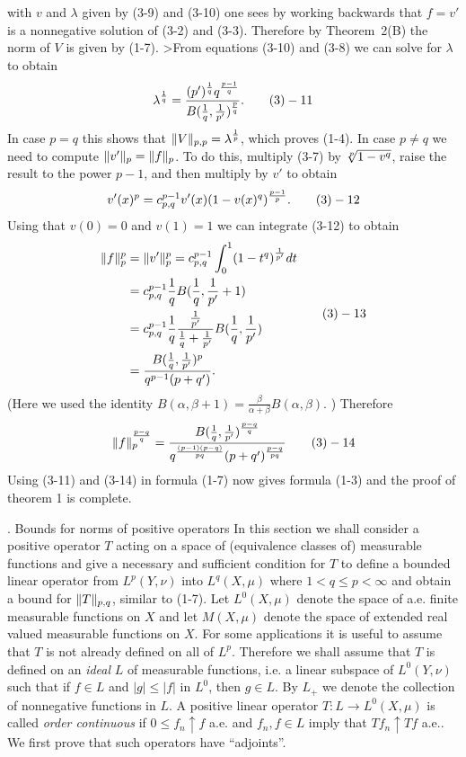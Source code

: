 with $v$ and $\lambda$ given by (3-9) and (3-10) one sees by working backwards
that $f=v'$ is a nonnegative solution of (3-2) and (3-3). Therefore by Theorem\
2(B) the norm of $V$ is given by (1-7). 
>From equations (3-10) and (3-8) we can solve for $\lambda$ to
obtain $$\lambda^{\frac 1q} =\frac {(p')^{\frac 1q}q^{\frac {p-1}q}}{B(\frac
1q ,\frac 1{p'})^{\frac pq}}. \tag 3-11$$
In case $p=q$ this shows that $\| V\|_{p,p} =\lambda^{\frac 1p}$, which proves (1-4).
In
case $p \ne q$ we need to compute $\| v'\|_p =\| f\| _p $. To do this, multiply
(3-7) by $\root p \of{1-v^q}$, raise the result to the power
$p-1$, and then multiply by $v'$ to obtain
$$v'(x)^p = c_{p,q}^{p-1}v'(x) (1-v(x)^q)^{\frac {p-1}p}. \tag3-12$$
Using that $v(0)=0$ and $v(1)=1$ we can integrate (3-12) to obtain
$$\aligned \nfp ^p &=\| v'\|_p^p =c_{p,q}^{p-1} \int ^1_0 (1-t^q)^{\frac
1{p'}}dt\\
&=c_{p,q}^{p-1}\frac 1q B(\frac 1q ,\frac 1{p'} +1)\\
&=c_{p,q}^{p-1}\frac 1q \frac {\frac 1{p'}}{\frac 1q +\frac 1{p'}} B(\frac
1q ,\frac 1{p'})\\
&=\frac {B(\frac 1q ,\frac 1{p'})^p}{q^{p-1} (p+q')}. \endaligned \tag 3-13$$
(Here we used the identity $B(\alpha ,\beta +1)=\frac \beta{\alpha +\beta}
B(\alpha ,\beta  )$. ) Therefore 
$$\nfp^{\frac {p-q}q}= \frac {B(\frac 1q ,\frac 1{p'})^{\frac
{p-q}{q}}}{q^{\frac {(p-1)(p-q)}{pq}} (p+q')^{\frac {p-q}{pq}}} \tag 3-14$$
Using (3-11) and (3-14) in formula (1-7) now gives formula (1-3) and the proof
of theorem 1 is complete.

. Bounds for norms of positive operators \endheading
In this section we shall consider a positive operator $T$ acting on a space of
(equivalence classes of) measurable functions and give a necessary and
sufficient condition for $T$ to define a bounded linear operator from
$L^p(Y,\nu )$ into $L^q(X,\mu )$ where $1< q\leq p <\infty$ and obtain a
bound for $\| T\| _{p,q}$, similar to (1-7). Let $L^0(X,\mu)$ denote the space of a.e.
finite measurable functions on $X$ and let $M(X,\mu)$ denote the space of
extended real valued measurable functions on $X$. For some applications it is
useful to assume that $T$ is not already defined on all of $L^p$. Therefore we
shall assume that $T$ is defined on an {\it ideal} $L$ of measurable functions,
i.e. a linear subspace of $L^0(Y,\nu )$ such that if $f\in L$ and $|g| \le |f|$
in $L^0$, then $g\in L$. By $L_+$ we denote the collection of nonnegative
functions in $L$. A positive linear operator $T:L\to L^0(X,\mu )$ is called
{\it order continuous} if $0\leq f_n \uparrow f$  a.e. and $f_n , f \in L$
imply that $Tf_n \uparrow Tf$ a.e.. We first prove that such operators have
``adjoints''.

